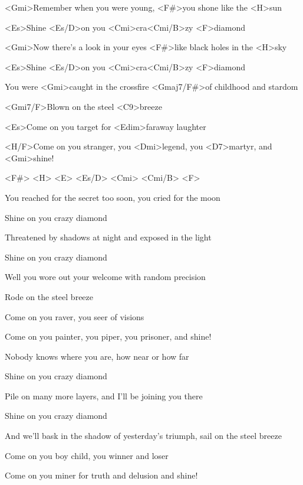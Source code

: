 

\zs
<Gmi>Remember when you were young,
<F#>you shone like the <H>sun

<Es>Shine <Es/D>on you <Cmi>cra<Cmi/B>zy <F>diamond

<Gmi>Now there's a look in your eyes
<F#>like black holes in the <H>sky

<Es>Shine <Es/D>on you <Cmi>cra<Cmi/B>zy <F>diamond

You were <Gmi>caught in the crossfire
<Gmaj7/F#>of childhood and stardom

<Gmi7/F>Blown on the steel <C9>breeze

<Es>Come on you target for <Edim>faraway laughter

<H/F>Come on you stranger, you <Dmi>legend, you <D7>martyr, and <Gmi>shine!
\ks

<F#> <H> <E> <Es/D> <Cmi> <Cmi/B> <F>

\zs
You reached for the secret too soon,
you cried for the moon

Shine on you crazy diamond

Threatened by shadows at night
and exposed in the light

Shine on you crazy diamond

Well you wore out your welcome
with random precision

Rode on the steel breeze

Come on you raver, you seer of visions

Come on you painter, you piper, you prisoner, and shine!
\ks

\zs
Nobody knows where you are,
how near or how far

Shine on you crazy diamond

Pile on many more layers,
and I'll be joining you there

Shine on you crazy diamond

And we'll bask in the shadow of yesterday's triumph,
sail on the steel breeze

Come on you boy child, you winner and loser

Come on you miner for truth and delusion and shine!
\ks

\kp
